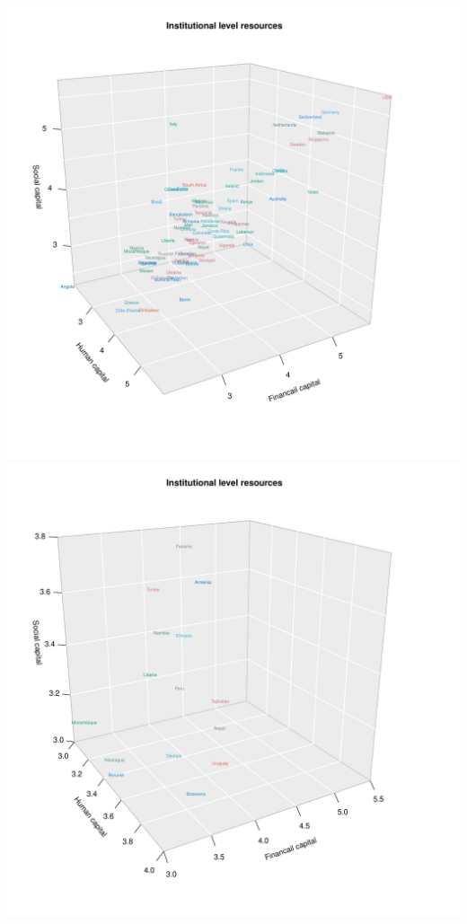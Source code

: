 \documentclass[
  english,
  man]{apa6}
\begin{document}
\includegraphics{Manuscript_files/figure-latex/unnamed-chunk-4-1.pdf} \includegraphics{Manuscript_files/figure-latex/unnamed-chunk-4-2.pdf}
\end{document}
